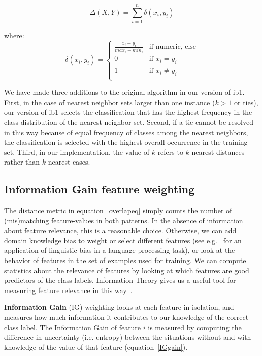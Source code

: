 \documentclass{report}
\begin{document}
\begin{equation}
\Delta(X,Y) = \sum_{i=1}^{n} \delta(x_{i},y_{i})
\label{distance}
\end{equation}

where:
\begin{equation}
\delta(x_{i}, y_{i}) = \left\{ \begin{array}{ll}
		\frac{x_{i}-y_{i}}{max_{i}-min_{i}} & \mbox{if numeric, else}\\
		0 & \mbox{if $x_{i} = y_{i}$}\\
		1 & \mbox{if $x_{i} \neq y_{i}$}\\
	\end{array} \right.
\label{overlapeq}
\end{equation}

We have made three additions to the original algorithm \cite{Aha+91} in
our version of {\sc ib1}.  First, in the case of nearest neighbor sets
larger than one instance ($k>1$ or ties), our version of {\sc ib1}
selects the classification that has the highest frequency in the class
distribution of the nearest neighbor set. Second, if a tie cannot be
resolved in this way because of equal frequency of classes among the
nearest neighbors, the classification is selected with the highest
overall occurrence in the training set. Third, in our implementation,
the value of $k$ refers to $k$-nearest distances rather than
$k$-nearest cases.

\subsection{Information Gain feature weighting}
\label{infogain}

The distance metric in equation~\ref{overlapeq} simply counts the
number of (mis)matching feature-values in both patterns. In the
absence of information about feature relevance, this is a reasonable
choice. Otherwise, we can add domain knowledge bias to weight or
select different features (see e.g.~\cite{Cardie96} for an
application of linguistic bias in a language processing task), or look
at the behavior of features in the set of examples used for
training. We can compute statistics about the relevance of features by
looking at which features are good predictors of the class
labels. Information Theory gives us a useful tool for measuring
feature relevance in this way~\cite{Quinlan86,Quinlan93}.

{\bf Information Gain} (IG) weighting looks at each feature in
isolation, and measures how much information it contributes to our
knowledge of the correct class label. The Information Gain of feature
$i$ is measured by computing the difference in uncertainty
(i.e. entropy) between the situations without and with knowledge of
the value of that feature (equation~\ref{IGgain}).
\end{document}
